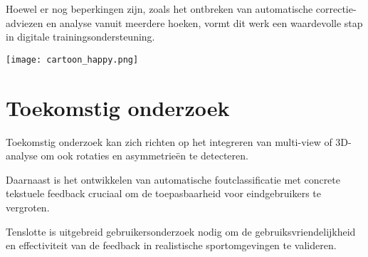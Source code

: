 \documentclass[a0,portrait]{hogent-poster}
\begin{document}
\begin{multicols}{2}
\begin{minipage}[t]{0.48\linewidth}
Hoewel er nog beperkingen zijn, zoals het ontbreken van automatische correctie-adviezen en analyse vanuit meerdere hoeken, vormt dit werk een waardevolle stap in digitale trainingsondersteuning.

\end{minipage}
\hfill
\begin{minipage}[t]{0.48\linewidth}
\texttt{[image: cartoon\_happy.png]}
\end{minipage}
\vspace{1em}

\section{Toekomstig onderzoek}

Toekomstig onderzoek kan zich richten op het integreren van multi-view of 3D-analyse om ook rotaties en asymmetrieën te detecteren. 

Daarnaast is het ontwikkelen van automatische foutclassificatie met concrete tekstuele feedback cruciaal om de toepasbaarheid voor eindgebruikers te vergroten. 

Tenslotte is uitgebreid gebruikersonderzoek nodig om de gebruiksvriendelijkheid en effectiviteit van de feedback in realistische sportomgevingen te valideren.

\end{multicols}
\end{document}
